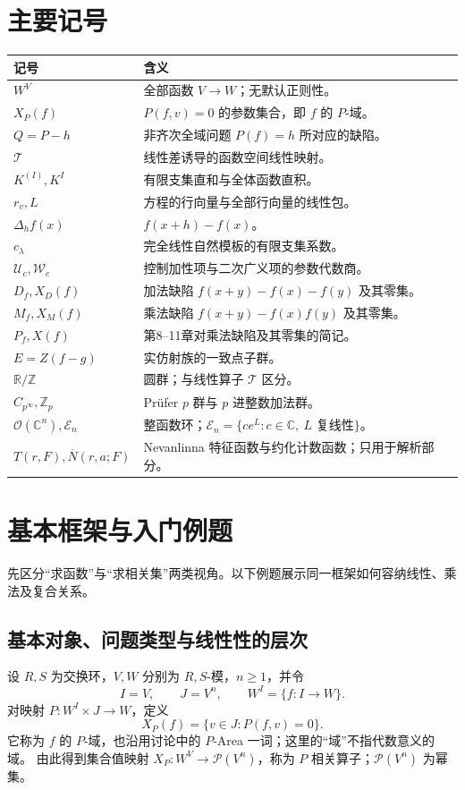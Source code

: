 \documentclass[11pt,a4paper,oneside,openany]{book}
\theoremstyle{lecture}
\newcommand{\C}{\mathbb C}
\newcommand{\Z}{\mathbb Z}
\newcommand{\Circle}{\mathbb R/\mathbb Z}
\newcommand{\T}{\mathcal T}
\newcommand{\Uc}{\mathscr U_c}
\newcommand{\Wc}{\mathscr W_c}
\newcommand{\OO}{\mathcal O}
\newcommand{\bN}{\overline N}
\newcommand{\En}{\mathcal E_n}
\newcommand{\Pow}{\mathcal P}
\numberwithin{equation}{section}
\begin{document}
\chapter*{主要记号}
\begin{longtable}{@{}p{}p{}@{}}
\toprule 记号 & 含义 \\\midrule
\endhead
$W^V$ & 全部函数 $V\to W$；无默认正则性。\\
$X_P(f)$ & $P(f,v)=0$ 的参数集合，即 $f$ 的 $P$-域。\\
$Q=P-h$ & 非齐次全域问题 $P(f)=h$ 所对应的缺陷。\\
$\T$ & 线性差诱导的函数空间线性映射。\\
$K^{(I)},K^I$ & 有限支集直和与全体函数直积。\\
$r_v,L$ & 方程的行向量与全部行向量的线性包。\\
$\Delta_h f(x)$ & $f(x+h)-f(x)$。\\
$c_\lambda$ & 完全线性自然模板的有限支集系数。\\
$\Uc,\Wc$ & 控制加性项与二次广义项的参数代数商。\\
$D_f,X_D(f)$ & 加法缺陷 $f(x+y)-f(x)-f(y)$ 及其零集。\\
$M_f,X_M(f)$ & 乘法缺陷 $f(x+y)-f(x)f(y)$ 及其零集。\\
$P_f,X(f)$ & 第8--11章对乘法缺陷及其零集的简记。\\
$E=Z(f-g)$ & 实仿射族的一致点子群。\\
$\Circle$ & 圆群；与线性算子 $\T$ 区分。\\
$C_{p^\infty},\Z_p$ & Prüfer $p$ 群与 $p$ 进整数加法群。\\
$\OO(\C^n),\En$ & 整函数环；$\En=\{ce^L:c\in\C,\ L\text{ 复线性}\}$。\\
$T(r,F),\bN(r,a;F)$ & Nevanlinna 特征函数与约化计数函数；只用于解析部分。\\
\bottomrule
\end{longtable}
\mainmatter


\chapter{基本框架与入门例题}\label{ch:framework}
先区分“求函数”与“求相关集”两类视角。以下例题展示同一框架如何容纳线性、乘法及复合关系。
\section{基本对象、问题类型与线性性的层次}
设 $R,S$ 为交换环，$V,W$ 分别为 $R,S$-模，$n\ge1$，并令
\[
 I=V,\qquad J=V^n,\qquad W^I=\{f:I\to W\}.
\]
对映射 $P:W^I\times J\to W$，定义
\[
 X_P(f)=\{v\in J:P(f,v)=0\}.
\]
它称为 $f$ 的 $P$-域，也沿用讨论中的 $P$-Area 一词；这里的“域”不指代数意义的域。
由此得到集合值映射 $X_P:W^V\to\Pow(V^n)$，称为 $P$ 相关算子；$\Pow(V^n)$ 为幂集。
\end{document}
